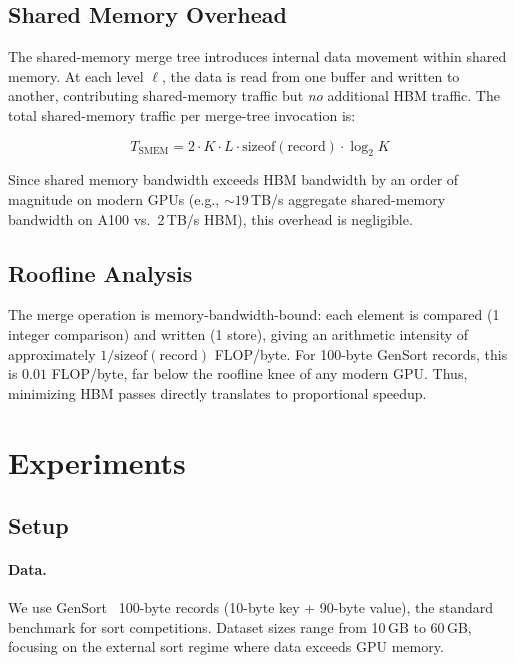 \documentclass[conference,10pt]{IEEEtran}
\begin{document}
\subsection{Shared Memory Overhead}

The shared-memory merge tree introduces internal data movement within
shared memory.  At each level $\ell$, the data is read from one buffer and
written to another, contributing shared-memory traffic but \emph{no}
additional HBM traffic.  The total shared-memory traffic per merge-tree
invocation is:

\begin{equation}
  T_{\text{SMEM}} = 2 \cdot K \cdot L \cdot \text{sizeof}(\text{record}) \cdot \log_2 K
  \label{eq:smem_traffic}
\end{equation}

Since shared memory bandwidth exceeds HBM bandwidth by an order of
magnitude on modern GPUs (e.g., ${\sim}19$\,TB/s aggregate shared-memory
bandwidth on A100 vs.\ 2\,TB/s HBM), this overhead is negligible.

\subsection{Roofline Analysis}

The merge operation is memory-bandwidth-bound: each element is compared
(1 integer comparison) and written (1 store), giving an arithmetic
intensity of approximately $1/\text{sizeof}(\text{record})$ FLOP/byte.
For 100-byte GenSort records, this is $0.01$ FLOP/byte, far below the
roofline knee of any modern GPU.  Thus, minimizing HBM passes directly
translates to proportional speedup.


\section{Experiments}
\label{sec:experiments}

\subsection{Setup}

\paragraph{Data.}
We use GenSort~\cite{gensort} 100-byte records (10-byte key + 90-byte
value), the standard benchmark for sort competitions.  Dataset sizes range
from 10\,GB to 60\,GB, focusing on the external sort regime where data
exceeds GPU memory.
\end{document}
